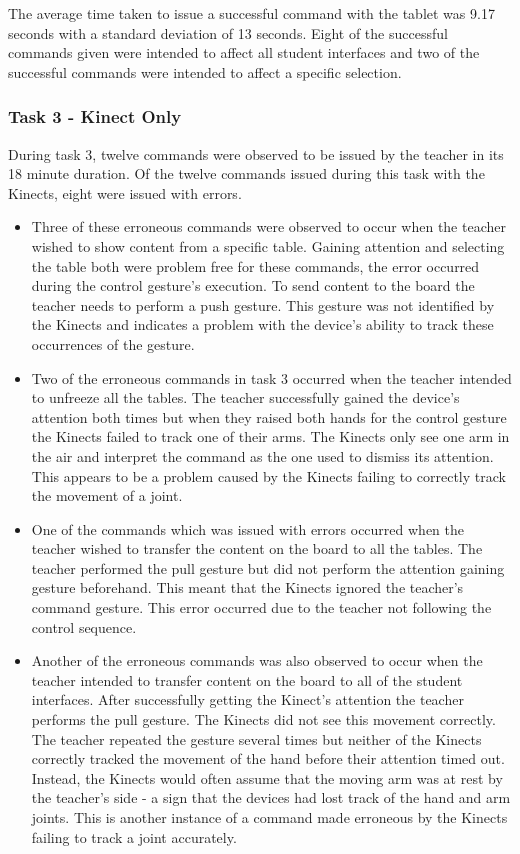 \documentclass[link]{IWCOMP}
\begin{document}
The average time taken to issue a successful command with the tablet was 9.17 seconds with a standard deviation of 13 seconds.
Eight of the successful commands given were intended to affect all student interfaces and two of the successful commands were intended to affect a specific selection.

\subsubsection{Task 3 - Kinect Only}
\label{subsubsec:studyPhase2ResultsTask3}

During task 3, twelve commands were observed to be issued by the teacher in its 18 minute duration.
Of the twelve commands issued during this task with the Kinects, eight were issued with errors.

\begin{itemize}
\item Three of these erroneous commands were observed to occur when the teacher wished to show content from a specific table.
Gaining attention and selecting the table both were problem free for these commands, the error occurred during the control gesture's execution.
To send content to the board the teacher needs to perform a push gesture.
This gesture was not identified by the Kinects and indicates a problem with the device's ability to track these occurrences of the gesture.

\item Two of the erroneous commands in task 3 occurred when the teacher intended to unfreeze all the tables.
The teacher successfully gained the device's attention both times but when they raised both hands for the control gesture the Kinects failed to track one of their arms.
The Kinects only see one arm in the air and interpret the command as the one used to dismiss its attention.
This appears to be a problem caused by the Kinects failing to correctly track the movement of a joint.

\item One of the commands which was issued with errors occurred when the teacher wished to transfer the content on the board to all the tables.
The teacher performed the pull gesture but did not perform the attention gaining gesture beforehand.
This meant that the Kinects ignored the teacher's command gesture.
This error occurred due to the teacher not following the control sequence.

\item Another of the erroneous commands was also observed to occur when the teacher intended to transfer content on the board to all of the student interfaces.
After successfully getting the Kinect's attention the teacher performs the pull gesture.
The Kinects did not see this movement correctly.
The teacher repeated the gesture several times but neither of the Kinects correctly tracked the movement of the hand before their attention timed out.
Instead, the Kinects would often assume that the moving arm was at rest by the teacher's side - a sign that the devices had lost track of the hand and arm joints.
This is another instance of a command made erroneous by the Kinects failing to track a joint accurately.


\end{itemize}
\end{document}
